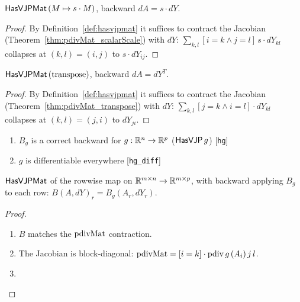 \begin{theorem}
  \label{thm:scalarScaleHasVJP}
  \leanok
  \(\mathsf{HasVJPMat}\, (M \mapsto s \cdot M)\), backward
  \(dA = s \cdot dY\).
\end{theorem}

\begin{proof}
\leanok
By Definition~\ref{def:hasvjpmat} it suffices to contract the
Jacobian (Theorem~\ref{thm:pdivMat_scalarScale}) with \(dY\):
\(\sum_{k,l} [i = k \wedge j = l]\, s \cdot dY_{kl}\) collapses at
\((k, l) = (i, j)\) to \(s \cdot dY_{ij}\). \Qed{}
\end{proof}

\begin{theorem}
  \label{thm:transposeHasVJP}
  \leanok
  \(\mathsf{HasVJPMat}\, (\mathrm{transpose})\), backward
  \(dA = dY^{T}\).
\end{theorem}

\begin{proof}
\leanok
By Definition~\ref{def:hasvjpmat} it suffices to contract the
Jacobian (Theorem~\ref{thm:pdivMat_transpose}) with \(dY\):
\(\sum_{k,l} [j = k \wedge i = l] \cdot dY_{kl}\) collapses at
\((k, l) = (j, i)\) to \(dY_{ji}\). \Qed{}
\end{proof}

\begin{theorem}
  \label{thm:rowwiseHasVJPMat}
  \leanok
  \Assume{}
  \begin{enumerate}
    \item \(B_g\) is a correct backward for
          \(g : \mathbb{R}^{n} \to \mathbb{R}^{p}\) (\(\mathsf{HasVJP}\, g\))
          \hfill[\texttt{hg}]
    \item \(g\) is differentiable everywhere \hfill[\texttt{hg\_diff}]
  \end{enumerate}
  \Prove{} \(\mathsf{HasVJPMat}\) of the rowwise map on
  \(\mathbb{R}^{m \times n} \to \mathbb{R}^{m \times p}\), with backward applying \(B_g\) to
  each row: \(B(A, dY)_r = B_g(A_r, dY_r)\).
\end{theorem}

\begin{proof}
\leanok
\begin{enumerate}
  \item \Suffices{} \(B\) matches the \(\operatorname{pdivMat}\) contraction.
  \item The Jacobian is block-diagonal:
    \(\operatorname{pdivMat} = [i = k] \cdot \operatorname{pdiv} g\, (A_i)\, j\, l\).
  \item \Qed{}
\end{enumerate}
\end{proof}

